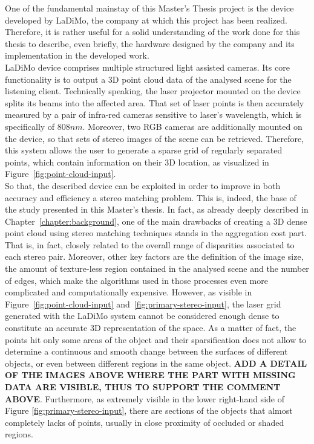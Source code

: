 One of the fundamental mainstay of this Master's Thesis project is the device developed by LaDiMo, the company at which this project has been realized.
Therefore, it is rather useful for a solid understanding of the work done for this thesis to describe, even briefly, the hardware designed by the company and its implementation in the developed work. \\
LaDiMo device comprises multiple structured light assisted cameras. 
Its core functionality is to output a 3D point cloud data of the analysed scene for the listening client. 
Technically speaking, the laser projector mounted on the device splits its beams into the affected area.
That set of laser points is then accurately measured by a pair of infra-red cameras sensitive to laser's wavelength, which is specifically of $808 nm$.
Moreover, two RGB cameras are additionally mounted on the device, so that sets of stereo images of the scene can be retrieved.
Therefore, this system allows the user to generate a sparse grid of regularly separated points, which contain information on their 3D location, as visualized in Figure~\ref{fig:point-cloud-input}. \\
So that, the described device can be exploited in order to improve in both accuracy and efficiency a stereo matching problem.
This is, indeed, the base of the study presented in this Master's thesis. 
In fact, as already deeply described in Chapter~\ref{chapter:background}, one of the main drawbacks of creating a 3D dense point cloud using stereo matching techniques stands in the aggregation cost part. 
That is, in fact, closely related to the overall range of disparities associated to each stereo pair. 
Moreover, other key factors are the definition of the image size, the amount of texture-less region contained in the analysed scene and the number of edges, which make the algorithms used in those processes even more complicated and computationally expensive. 
However, as visible in Figure~\ref{fig:point-cloud-input} and~\ref{fig:primary-stereo-input}, the laser grid generated with the LaDiMo system cannot be considered enough dense to constitute an accurate 3D representation of the space. 
As a matter of fact, the points hit only some areas of the object and their sparsification does not allow to determine a continuous and smooth change between the surfaces of different objects, or even between different regions in the same object.
\textbf{ADD A DETAIL OF THE IMAGES ABOVE WHERE THE PART WITH MISSING DATA ARE VISIBLE, THUS TO SUPPORT THE COMMENT ABOVE}.
Furthermore, as extremely visible in the lower right-hand side of Figure \ref{fig:primary-stereo-input}, there are sections of the objects that almost completely lacks of points, usually in close proximity of occluded or shaded regions.\\
